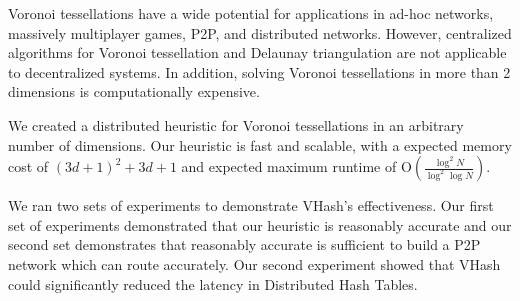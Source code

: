 Voronoi tessellations have a wide potential for applications in ad-hoc networks, massively multiplayer games, P2P, and distributed networks. 
However, centralized algorithms for Voronoi tessellation and Delaunay triangulation are not applicable to decentralized systems.
In addition, solving Voronoi tessellations in more than 2 dimensions is computationally expensive.

We created a distributed heuristic for Voronoi tessellations in an arbitrary number of dimensions.
Our heuristic is fast and scalable, with a expected memory cost of $(3d+1)^{2}+3d+1$ and expected maximum runtime of O$(\frac{\log^{2} N}{\log^{2} \log N} )$.

We ran two sets of experiments to demonstrate VHash's effectiveness.
Our first set of experiments demonstrated that our heuristic is reasonably accurate  and our second set demonstrates that reasonably accurate is sufficient to build a P2P network which can route accurately.
Our second experiment showed that VHash  could significantly reduced the latency in Distributed Hash Tables.










